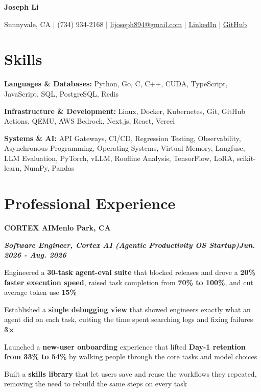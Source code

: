 \documentclass[10pt]{article}
\renewcommand{\resumeheader}[2]{%
  {\centering\fontsize{16}{18}\selectfont\bfseries #1\par}%
  \vspace{4pt}%
  {\centering\fontsize{10.5}{13}\selectfont #2\par}%
  \vspace{6pt}%
}
\renewcommand{\skill}[2]{\textbf{#1:} #2\par\vspace{1.5pt}}
\newcommand{\job}[4]{%
  \vspace{0pt}%
  \textbf{\MakeUppercase{#1}}\hfill\textbf{#2}\par
  \vspace{0.5pt}%
  \textbf{\textit{#3}}\hfill\textbf{\textit{#4}}\par
}
\begin{document}
\resumeheader{Joseph Li}{%
Sunnyvale, CA | (734) 934-2168 | \href{mailto:lijoseph894@gmail.com}{lijoseph894@gmail.com} | \href{https://www.linkedin.com/in/lijoseph894/}{\underline{LinkedIn}} | \href{https://josephl894.github.io/}{\underline{GitHub}}}

\section{Skills}
\skill{Languages \& Databases}{Python, Go, C, C++, CUDA, TypeScript, JavaScript, SQL, PostgreSQL, Redis}
\skill{Infrastructure \& Development}{Linux, Docker, Kubernetes, Git, GitHub Actions, QEMU, AWS Bedrock, Next.js, React, Vercel}
\skill{Systems \& AI}{API Gateways, CI/CD, Regression Testing, Observability, Asynchronous Programming, Operating Systems, Virtual Memory, Langfuse, LLM Evaluation, PyTorch, vLLM, Roofline Analysis, TensorFlow, LoRA, scikit-learn, NumPy, Pandas}

\section{Professional Experience}
\job{Cortex AI}{Menlo Park, CA}{Software Engineer, Cortex AI (Agentic Productivity OS Startup)}{Jun. 2026 - Aug. 2026}
\begin{bullets}
  \item Engineered a \textbf{30-task agent-eval suite} that blocked releases and drove a \textbf{20\% faster execution speed}, raised task completion from \textbf{70\% to 100\%}, and cut average token use \textbf{15\%}
  \item Established a \textbf{single debugging view} that showed engineers exactly what an agent did on each task, cutting the time spent searching logs and fixing failures \textbf{3×}
  \item Launched a \textbf{new-user onboarding} experience that lifted \textbf{Day-1 retention from 33\% to 54\%} by walking people through the core tasks and model choices
  \item Built a \textbf{skills library} that let users save and reuse the workflows they repeated, removing the need to rebuild the same steps on every task
\end{bullets}
\end{document}
